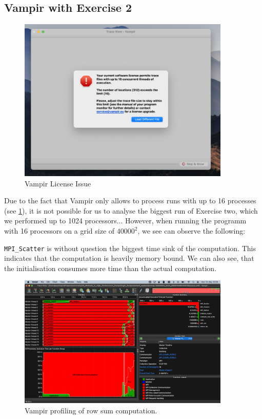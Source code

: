 \documentclass[a4paper,10pt]{article}
\begin{document}
\subsection{Vampir with Exercise 2}
\begin{figure}[H]
  \centering
  \includegraphics[width=0.9\textwidth]{img/ex3/ex3_license}
  \caption{Vampir License Issue}
  \label{fig:ex3_license}
\end{figure}

Due to the fact that Vampir only allows to process runs with up to 16 processes (see \ref{fig:ex3_license}), it is not possible for us to analyse the biggest run of Exercise two, which we performed up to 1024 processors...
However, when running the programm with 16 processors on a grid size of $40000^2$, we see can observe the following:

\verb|MPI_Scatter| is without question the biggest time sink of the computation. This indicates that the computation is heavily memory bound.
We can also see, that the initialisation consumes more time than the actual computation.

\begin{figure}[h]
  \centering
  \includegraphics[width=0.9\textwidth]{img/ex3/ex3_vampir}
  \caption{Vampir profiling of row sum computation.}
  \label{fig:ex3_vampir}
\end{figure}
\end{document}
